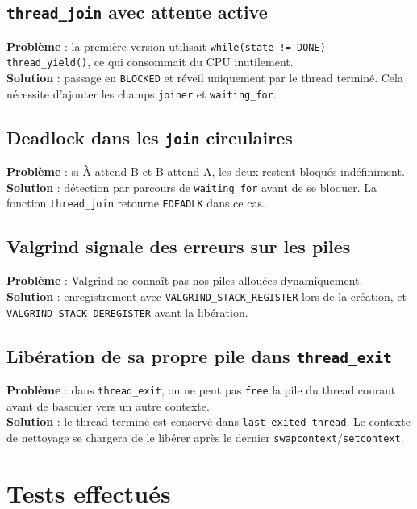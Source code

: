 \documentclass[12pt,a4paper]{article}
\begin{document}
\subsection{\texttt{thread\_join} avec attente active}

\textbf{Problème} : la première version utilisait \texttt{while(state != DONE) thread\_yield()}, ce qui consommait du CPU inutilement.\\
\textbf{Solution} : passage en \texttt{BLOCKED} et réveil uniquement par le thread terminé. Cela nécessite d’ajouter les champs \texttt{joiner} et \texttt{waiting\_for}.

\subsection{Deadlock dans les \texttt{join} circulaires}

\textbf{Problème} : si À attend B et B attend A, les deux restent bloqués indéfiniment.\\
\textbf{Solution} : détection par parcours de \texttt{waiting\_for} avant de se bloquer. La fonction \texttt{thread\_join} retourne \texttt{EDEADLK} dans ce cas.

\subsection{Valgrind signale des erreurs sur les piles}

\textbf{Problème} : Valgrind ne connaît pas nos piles allouées dynamiquement.\\
\textbf{Solution} : enregistrement avec \texttt{VALGRIND\_STACK\_REGISTER} lors de la création, et \texttt{VALGRIND\_STACK\_DEREGISTER} avant la libération.

\subsection{Libération de sa propre pile dans \texttt{thread\_exit}}

\textbf{Problème} : dans \texttt{thread\_exit}, on ne peut pas \texttt{free} la pile du thread courant avant de basculer vers un autre contexte.\\
\textbf{Solution} : le thread terminé est conservé dans \texttt{last\_exited\_thread}. Le contexte de nettoyage se chargera de le libérer après le dernier \texttt{swapcontext}/\texttt{setcontext}.

\section{Tests effectués}
\end{document}
